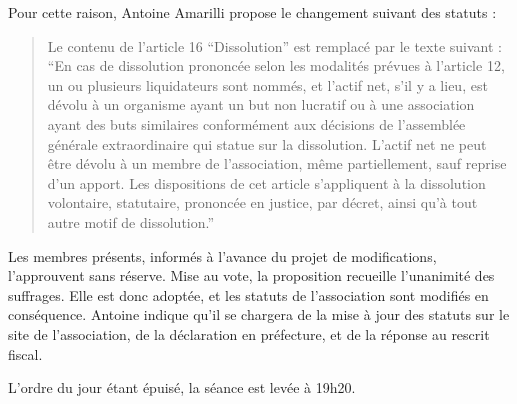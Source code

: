 \documentclass{scrartcl}
\begin{document}
Pour cette raison, Antoine Amarilli propose le changement suivant des statuts :

\begin{quote}
\og Le contenu de l'article 16 ``Dissolution'' est remplacé par le texte suivant
: ``En cas de dissolution prononcée selon les modalités prévues à l’article
12, un ou plusieurs liquidateurs sont nommés, et l'actif net, s'il y a lieu, est
dévolu à un organisme ayant un but non lucratif ou à une association ayant des
buts similaires conformément aux décisions de l’assemblée générale
extraordinaire qui statue sur la dissolution. L’actif net ne peut être dévolu à
un membre de l’association, même partiellement, sauf reprise d’un apport. Les
dispositions de cet article s'appliquent à la dissolution volontaire,
statutaire, prononcée en justice, par décret, ainsi qu'à tout autre motif de
dissolution.'' \fg
\end{quote}

Les membres présents, informés à l'avance du projet de modifications,
l'approuvent sans réserve. Mise au vote, la proposition recueille l'unanimité
des suffrages. Elle est donc adoptée, et les statuts de l'association sont
modifiés en conséquence. Antoine indique qu'il se chargera de la mise à jour des
statuts sur le site de l'association, de la déclaration en préfecture, et de la
réponse au rescrit fiscal.

\bigskip

L'ordre du jour étant épuisé, la séance est levée à 19h20.
\end{document}
